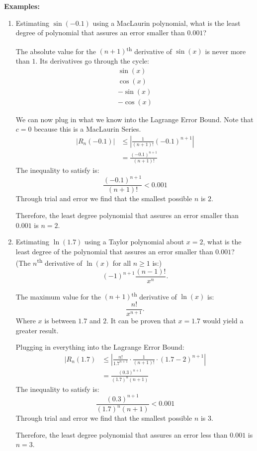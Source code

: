 \documentclass[12pt]{article}
\begin{document}
\noindent \textbf{Examples:}
\begin{enumerate}
    \item Estimating $\sin(-0.1)$ using a MacLaurin polynomial, what is the least degree of polynomial that assures an error smaller than $0.001$?

          The absolute value for the $(n+1)$\textsuperscript{th} derivative of $\sin(x)$ is never more than $1$. Its derivatives go through the cycle:
          \begin{gather*}
              \sin(x) \\
              \cos(x) \\
              -\sin(x) \\
              -\cos(x)
          \end{gather*}

          We can now plug in what we know into the Lagrange Error Bound. Note that $c=0$ because this is a MacLaurin Series.
          \begin{align*}
              |R_n(-0.1)| & \le \left| \frac{1}{(n+1)!} (-0.1)^{n+1} \right| \\
                          & = \frac{(-0.1)^{n+1}}{(n+1)!}
          \end{align*}
          The inequality to satisfy is:
          \[ \frac{(-0.1)^{n+1}}{(n+1)!} < 0.001 \]
          Through trial and error we find that the smallest possible $n$ is $2$.

          Therefore, the least degree polynomial that assures an error smaller than $0.001$ is $n=2$.
          \bigskip

    \item Estimating $\ln(1.7)$ using a Taylor polynomial about $x=2$, what is the least degree of the polynomial that assures an error smaller than $0.001$?
          \\ (The $n$\textsuperscript{th} derivative of $\ln(x)$ for all $n \ge 1$ is:)
          \[ (-1)^{n+1} \frac{(n-1)!}{x^n}. \]

          The maximum value for the $(n+1)$\textsuperscript{th} derivative of $\ln(x)$ is:
          \[ \frac{n!}{x^{n+1}}. \]
          Where $x$ is between $1.7$ and $2$. It can be proven that $x=1.7$ would yield a greater result.

          Plugging in everything into the Lagrange Error Bound:
          \begin{align*}
              |R_n(1.7) & \le \left| \frac{n!}{1.7^{n+1}} \cdot \frac{1}{(n+1)!} \cdot (1.7-2)^{n+1} \right| \\[6pt]
                        & = \frac{(0.3)^{n+1}}{(1.7)^n (n+1)}
          \end{align*}
          The inequality to satisfy is:
          \[ \frac{(0.3)^{n+1}}{(1.7)^n (n+1)} < 0.001 \]
          Through trial and error we find that the smallest possible $n$ is $3$.

          Therefore, the least degree polynomial that assures an error less than $0.001$ is $n=3$.
\end{enumerate}
\end{document}
